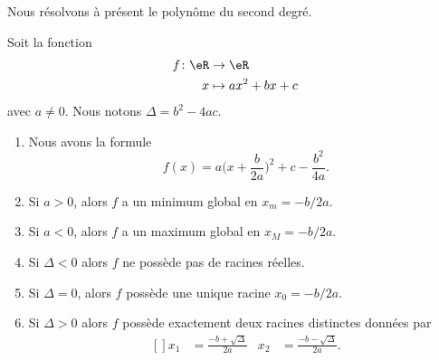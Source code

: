 Nous résolvons à présent le polynôme du second degré.
\begin{proposition}       \label{PROPooEZIKooKjJroH}
	Soit la fonction
	\begin{equation}
		\begin{aligned}
			f\colon \eR & \to \eR           \\
			x           & \mapsto ax^2+bx+c
		\end{aligned}
	\end{equation}
	avec \( a\neq 0\). Nous notons \( \Delta=b^2-4ac\).

	\begin{enumerate}
		\item       \label{ITEMooMKUSooWwNTba}
		      Nous avons la formule
		      \begin{equation}        \label{EQooFKPOooAbIhCx}
			      f(x)=a\big( x+\frac{ b }{ 2a } \big)^2+c-\frac{ b^2 }{ 4a }.
		      \end{equation}
		\item       \label{ITEMooHQTBooZuaPAs}
		      Si \( a>0\), alors \( f\) a un minimum global en \( x_m=-b/2a\).
		\item       \label{ITEMooQMXVooWsqiXz}
		      Si \( a<0\), alors \( f\) a un maximum global en \( x_M=-b/2a\).
		\item       \label{ITEMooMAMHooNWZVQI}
		      Si \( \Delta<0\) alors \( f\) ne possède pas de racines réelles.
		\item       \label{ITEMooKUUJooTsIHhI}
		      Si \( \Delta=0\), alors \( f\) possède une unique racine \( x_0=-b/2a\).
		\item       \label{ITEMooQZGFooEGhMkX}
		      Si \( \Delta>0\) alors \( f\) possède exactement deux racines distinctes données par
		      \begin{equation}        \label{EQooGHDPooVkqINr}
			      \begin{aligned}[]
				      x_1 & =\frac{ -b+\sqrt{ \Delta } }{ 2a } & x_2 & =\frac{ -b-\sqrt{ \Delta } }{ 2a }.
			      \end{aligned}
		      \end{equation}
	\end{enumerate}
\end{proposition}

